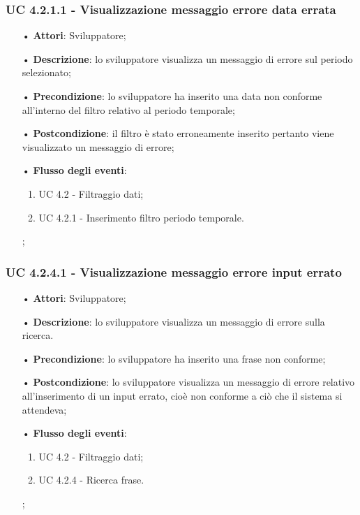 \subsubsection{UC 4.2.1.1 - Visualizzazione messaggio errore data errata}
\begin{itemize}
	\item[•]\textbf{Attori}: Sviluppatore;
	\item[•]\textbf{Descrizione}: lo sviluppatore visualizza un messaggio di errore sul periodo selezionato;
	\item[•]\textbf{Precondizione}: lo sviluppatore ha inserito una data non conforme all'interno del filtro relativo al periodo temporale;
	\item[•]\textbf{Postcondizione}: il filtro è stato erroneamente inserito pertanto viene visualizzato un messaggio di errore;
	\item[•]\textbf{Flusso degli eventi}: 
	\begin{enumerate}
		\item UC 4.2 - Filtraggio dati;
		\item UC 4.2.1 - Inserimento filtro periodo temporale.
	\end{enumerate};
\end{itemize}
\subsubsection{UC 4.2.4.1 - Visualizzazione messaggio errore input errato}
\begin{itemize}
	\item[•]\textbf{Attori}: Sviluppatore;
	\item[•]\textbf{Descrizione}: lo sviluppatore visualizza un messaggio di errore sulla ricerca.
	\item[•]\textbf{Precondizione}: lo sviluppatore ha inserito una frase non conforme;
	\item[•]\textbf{Postcondizione}: lo sviluppatore visualizza un messaggio di errore relativo all'inserimento di un input errato, cioè non conforme a ciò che il sistema si attendeva;
	\item[•]\textbf{Flusso degli eventi}: 
	\begin{enumerate}
		\item UC 4.2 - Filtraggio dati;
		\item UC 4.2.4 - Ricerca frase.
	\end{enumerate};	
\end{itemize}

  
